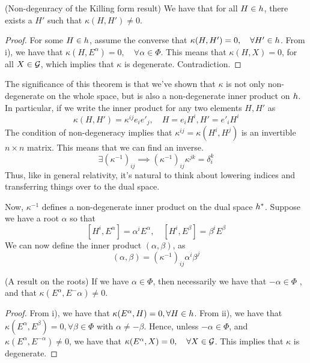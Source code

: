\begin{thm}{(Non-degenracy of the Killing form result)} 
	We have that for all $ H \in h $, there exists 
	a $ H ' $ such that $ \kappa ( H , H ' ) \neq 0 $. 
\begin{proof}
	For some $ H \in h $, assume the converse that 
	$ \kappa ( H , H ' ) = 0 , \quad \forall H ' \in h  $. 
	From i), we have that $ \kappa ( H , E ^ \alpha) = 0 , \quad \forall \alpha \in 
	\Phi $. This means that $ \kappa ( H , X )  = 0 $, for all 
	$ X \in \mathcal{ G } $, which implies that $ \kappa $ is degenerate. 
	Contradiction. 
\end{proof}
The significance of this theorem is that 
we've shown that $ \kappa $ is not only non-degenerate on the whole space, 
but is also a non-degenerate inner product on $ h $. 
In particular, if we write the inner product for any two 
elements $ H , H ' $ as 
\[
 \kappa ( H , H' ) = \kappa ^{ ij } e _ i e' _ j, \quad H = e_ i H ^ i, H ' = e ' _ i H ^ i  
\]  The condition of non-degeneracy implies that 
$ \kappa ^{ ij }  = \kappa ( H ^ i , H ^j ) $ is an invertible $ n \times n $ 
matrix. This means that we can find an inverse. 
\[
	\exists ( \kappa ^{ -1 } )_{ ij } \implies ( \kappa ^{ - 1} ) _{ ij } \kappa ^{ jk} 
	 = \delta ^ k _ i 
\] Thus, like in general relativity, it's natural to think 
about lowering indices and transferring things over to the dual space. 
\end{thm}
Now, $ \kappa ^{ -1 }  $ defines a non-degenerate inner product 
on the dual space $ h ^ * $. Suppose we have a root $ \alpha $ so 
that 
\[
 [ H ^ i , E ^ \alpha ] = \alpha ^ i E ^ \alpha, \quad [ H ^ i, E ^ \beta ] = \beta ^i E ^ \beta 
\] We can now define the inner product $ ( \alpha, \beta ) $, as 
\[
	( \alpha, \beta ) = ( \kappa ^{ - 1} ) _{ ij} \alpha ^ i \beta ^ j 
\] 
\begin{thm}{(A result on the roots)} 
	If we have $ \alpha \in \Phi $, then necessarily we have that
	$ - \alpha \in \Phi $ , and that $ \kappa ( E ^ \alpha , E ^ - \alpha ) \neq 0$. 

\begin{proof}
	From i), we have that $ \kappa ( E ^ \alpha , H )   = 0 , \forall H \in h $. 
	From ii), we have that $ \kappa ( E ^ \alpha , E ^ \beta )  = 0, \forall 
	\beta \in \Phi $ with $ \alpha \neq - \beta $. 
	Hence, unless $ - \alpha \in \Phi $, and $ \kappa ( E ^ \alpha , E ^{ - \alpha }  ) \neq 0 $, 
	we have that  $ \kappa ( E ^ \alpha , X ) = 0 , \quad \forall X \in \mathcal{ G } $. This
	implies that $ \kappa $ is degenerate. 
\end{proof}
\end{thm}

